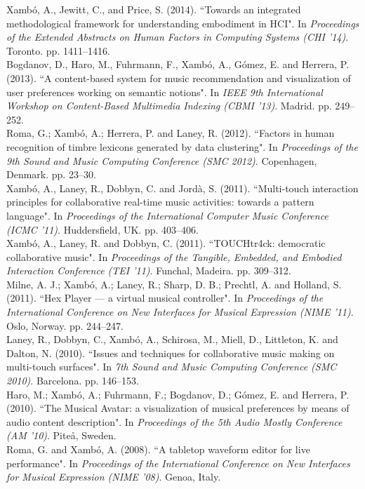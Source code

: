 \documentclass[10pt, a4paper]{article}
\newcommand{\years}[1]{\marginnote{\scriptsize #1}}
\begin{document}
\years{2014a}Xambó, A., Jewitt, C., and Price, S. (2014). “Towards an integrated methodological framework for understanding embodiment in HCI". In \emph{Proceedings of the Extended Abstracts on Human Factors in Computing Systems (CHI '14)}. Toronto. pp. 1411--1416.\\
\years{2013}Bogdanov, D., Haro, M., Fuhrmann, F., Xambó, A., Gómez, E. and Herrera, P. (2013). “A content-based system for music recommendation and visualization of user preferences working on semantic notions". In \emph{IEEE 9th International Workshop on Content-Based Multimedia Indexing (CBMI '13)}. Madrid. pp. 249--252.\\
\years{2012}Roma, G.; Xambó, A.; Herrera, P. and Laney, R. (2012). “Factors in human recognition of timbre lexicons generated by data clustering". In \emph{Proceedings of the 9th Sound and Music Computing Conference (SMC 2012)}. Copenhagen, Denmark. pp. 23--30.\\
\years{2011c}Xambó, A., Laney, R., Dobbyn, C. and Jordà, S. (2011). “Multi-touch interaction principles for collaborative real-time music activities: towards a pattern language". In \emph{Proceedings of the International Computer Music Conference (ICMC '11)}. Huddersfield, UK. pp. 403--406.\\
\years{2011b}Xambó, A., Laney, R. and Dobbyn, C. (2011). “TOUCHtr4ck: democratic collaborative music". In \emph{Proceedings of the Tangible, Embedded, and Embodied Interaction Conference (TEI '11)}. Funchal, Madeira. pp. 309--312.\\
\years{2011a}Milne, A. J.; Xambó, A.; Laney, R.; Sharp, D. B.; Prechtl, A. and Holland, S. (2011). “Hex Player — a virtual musical controller". In \emph{Proceedings of the International Conference on New Interfaces for Musical Expression (NIME '11)}. Oslo, Norway. pp. 244--247.\\
\years{2010b}Laney, R., Dobbyn, C., Xambó, A., Schirosa, M., Miell, D., Littleton, K. and Dalton, N. (2010). “Issues and techniques for collaborative music making on multi-touch surfaces". In \emph{7th Sound and Music Computing Conference (SMC 2010)}. Barcelona. pp. 146–153.\\
\years{2010a}Haro, M.; Xambó, A.; Fuhrmann, F.; Bogdanov, D.; Gómez, E. and Herrera, P. (2010). “The Musical Avatar: a visualization of musical preferences by means of audio content description". In \emph{Proceedings of the 5th Audio Mostly Conference (AM '10)}. Piteå, Sweden.\\
\years{2008}Roma, G. and Xambó, A. (2008). “A tabletop waveform editor for live performance". In \emph{Proceedings of the International Conference on New Interfaces for Musical Expression (NIME '08)}. Genoa, Italy.
\end{document}
